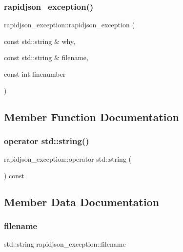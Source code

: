 \subsubsection{\texorpdfstring{rapidjson\_exception()}{rapidjson\_exception()}}
{\footnotesize\ttfamily rapidjson\+\_\+exception\+::rapidjson\+\_\+exception (\begin{DoxyParamCaption}\item[{const std\+::string \&}]{why,  }\item[{const std\+::string \&}]{filename,  }\item[{const int}]{linenumber }\end{DoxyParamCaption})\hspace{0.3cm}{\ttfamily [inline]}}



\subsection{Member Function Documentation}
\mbox{\label{structrapidjson__exception_afd42d8ce38804d2951ab8cd328cbd9e1}} 
\subsubsection{\texorpdfstring{operator std::string()}{operator std::string()}}
{\footnotesize\ttfamily rapidjson\+\_\+exception\+::operator std\+::string (\begin{DoxyParamCaption}{ }\end{DoxyParamCaption}) const\hspace{0.3cm}{\ttfamily [inline]}}



\subsection{Member Data Documentation}
\mbox{\label{structrapidjson__exception_a56bc0e220fc6c7037e877f9f2e3f99f0}} 
\subsubsection{\texorpdfstring{filename}{filename}}
{\footnotesize\ttfamily std\+::string rapidjson\+\_\+exception\+::filename}

